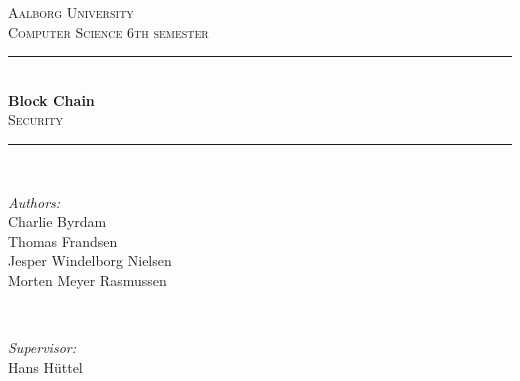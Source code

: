 %
\begin{titlepage}

\newcommand{\HRule}{\rule{\linewidth}{0.5mm}} %

\center %
\vspace*{2cm}

\textsc{\LARGE Aalborg University}\\[0.5cm] %
\textsc{\large Computer Science 6th semester}\\[1.0cm] %


\HRule \\[0.4cm]
{ \huge \bfseries Block Chain}\\[0.4cm] %
\textsc{\Large Security}\\[0.5cm]
\HRule \\[1.5cm]
 

\begin{minipage}{0.4\textwidth}
\begin{flushleft} \large
\emph{Authors:}\\
Charlie Byrdam\\
Thomas Frandsen\\
Jesper Windelborg Nielsen\\
Morten Meyer Rasmussen
\end{flushleft}
\end{minipage}
~
\begin{minipage}{0.4\textwidth}
\begin{flushright} \large
\emph{Supervisor:} \\
Hans Hüttel %
\end{flushright}
\end{minipage}\\[6cm]


\end{titlepage}
